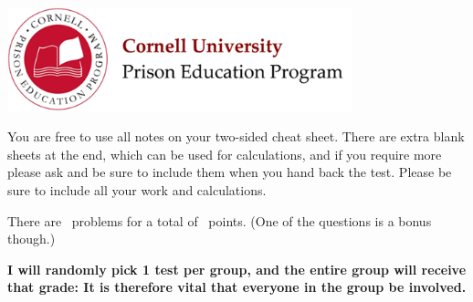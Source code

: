 \documentclass[addpoints,12pt]{exam}
\begin{document}

\begin{flushright}
\vspace{0.1in}

\vspace{0.1in}

\vspace{0.1in}
\end{flushright}

\begin{center}
\includegraphics[width=10cm]{../images/logo.png}
\end{center}

\begin{center}
\end{center}

\vspace{0.5in}

\begin{large}
You are free to use all notes on your two-sided cheat sheet. There are extra blank sheets at the end, which can be used for calculations, and if you require more please ask and be sure to include them when you hand back the test. Please be sure to include all your work and calculations.

There are \numquestions~problems for a total of \numpoints~points. (One of the questions is a bonus though.)

\textbf{I will randomly pick 1 test per group, and the entire group will receive that grade: It is therefore vital that everyone in the group be involved.}
\end{large}
\vspace{0.2in}


 
\clearpage
\end{document}
